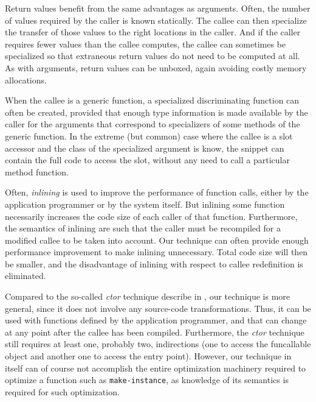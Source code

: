 Return values benefit from the same advantages as arguments.  Often,
the number of values required by the caller is known statically.  The
callee can then specialize the transfer of those values to the right
locations in the caller.  And if the caller requires fewer values than
the callee computes, the callee can sometimes be specialized so that
extraneous return values do not need to be computed at all.  As with
arguments, return values can be unboxed, again avoiding costly memory
allocations.

When the callee is a generic function, a specialized discriminating
function can often be created, provided that enough type information
is made available by the caller for the arguments that correspond to
specializers of some methods of the generic function.  In the extreme
(but common) case where the callee is a slot accessor and the class of
the specialized argument is know, the snippet can contain the full
code to access the slot, without any need to call a particular method
function.

Often, \emph{inlining} is used to improve the performance of function
calls, either by the application programmer or by the system itself.
But inlining some function necessarily increases the code size of each
caller of that function.  Furthermore, the semantics of inlining are
such that the caller must be recompiled for a modified callee to be
taken into account.  Our technique can often provide enough
performance improvement to make inlining unnecessary.  Total code size
will then be smaller, and the disadvantage of inlining with respect to
callee redefinition is eliminated.

Compared to the so-called \emph{ctor} technique describe in
, our technique is more general, since it
does not involve any source-code transformations.  Thus, it can be
used with functions defined by the application programmer, and that
can change at any point after the callee has been compiled.
Furthermore, the \emph{ctor} technique still requires at least one,
probably two, indirections (one to access the funcallable object and
another one to access the entry point).  However, our technique in
itself can of course not accomplish the entire optimization machinery
required to optimize a function such as \texttt{make-instance}, as
knowledge of its semantics is required for such optimization.

